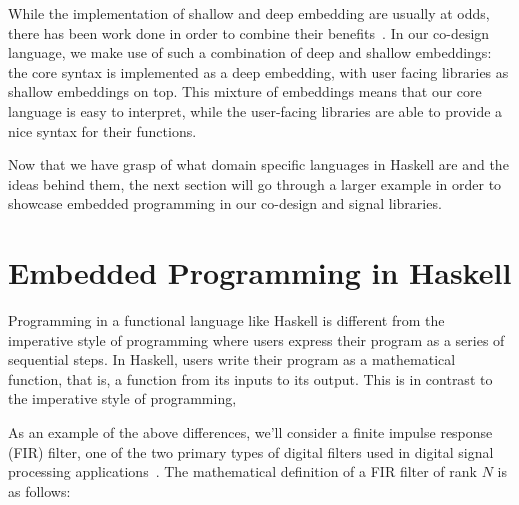 \documentclass[../main.tex]{subfiles}
\begin{document}
While the implementation of shallow and deep embedding are usually at odds, there has been work done in order to combine their benefits~\cite{svenningsson2012}. In our co-design language, we make use of such a combination of deep and shallow embeddings: the core syntax is implemented as a deep embedding, with user facing libraries as shallow embeddings on top. This mixture of embeddings means that our core language is easy to interpret, while the user-facing libraries are able to provide a nice syntax for their functions.


Now that we have grasp of what domain specific languages in Haskell are and the ideas behind them, the next section will go through a larger example in order to showcase embedded programming in our co-design and signal libraries.

\section{Embedded Programming in Haskell}
\label{haskell}

Programming in a functional language like Haskell is different from the imperative style of programming where users express their program as a series of sequential steps. In Haskell, users write their program as a mathematical function, that is, a function from its inputs to its output. This is in contrast to the imperative style of programming, 



As an example of the above differences, we'll consider a finite impulse response (FIR) filter, one of the two primary types of digital filters used in digital signal processing applications~\cite{oppenheim1989}. The mathematical definition of a FIR filter of rank $N$ is as follows:


\end{document}
